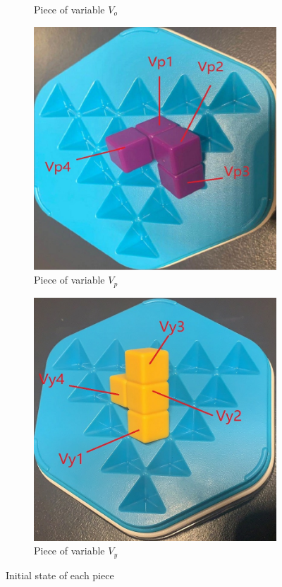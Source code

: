 \begin{figure}[htbp]
\begin{subfigure}[b]{0.25\textwidth}
\caption{Piece of variable $V_{o}$}
  \label{fig:3Dorange}
\end{subfigure}
\begin{subfigure}[b]{0.25\textwidth}
\centering
\includegraphics[width=\textwidth]{figs/3Dpurple.jpg}
\caption{Piece of variable $V_{p}$}
  \label{fig:3Dpurple}
\end{subfigure}
\begin{subfigure}[b]{0.25\textwidth}
\centering
\includegraphics[width=\textwidth]{figs/3Dyellow.jpg}
\caption{Piece of variable $V_{y}$}
  \label{fig:3Dyellow}
\end{subfigure}
\caption{Initial state of each piece}
  \label{fig:all3Dinit}
\end{figure}
